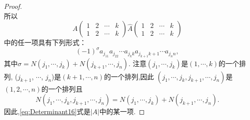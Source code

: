 \begin{proof}
\begin{equation*}
  \end{equation*}
  所以
  \begin{equation*}
    A
    \left(\begin{smallmatrix}
      1 & 2 & \cdots & k\\
      1 & 2 & \cdots & k
    \end{smallmatrix}\right)
    \widehat{A}
    \left(\begin{smallmatrix}
      1 & 2 & \cdots & k\\
      1 & 2 & \cdots & k
    \end{smallmatrix}\right)
  \end{equation*}
  中的任一项具有下列形式：
  \begin{equation}\label{eq:Determinant16}
    (-1)^\sigma a_{j_11}a_{j_22}\cdots a_{j_kk}a_{j_{k+1}k+1}\cdots a_{j_nn},
  \end{equation}
  其中$\sigma = N(j_1,\cdots,j_k)+N(j_{k+1},\cdots,j_n)$. 
  注意$(j_1,\cdots,j_k)$是$(1,\cdots,k)$的一个排列, 
  ($j_{k+1}$, $\cdots$, $j_n$)是$(k+1,\cdots,n)$的一个排列,因此
  $(j_1,\cdots,j_k,j_{k+1},\cdots,j_n)$是$(1,2,\cdots,n)$的一个排列且
  \begin{equation*}    N(j_1,\cdots,j_k,j_{k+1},\cdots,j_n)=N(j_1,\cdots,j_k)+N(j_{k+1},\cdots,j_n).
  \end{equation*}
  因此,\eqref{eq:Determinant16}式是$|A|$中的某一项.


\end{proof}

